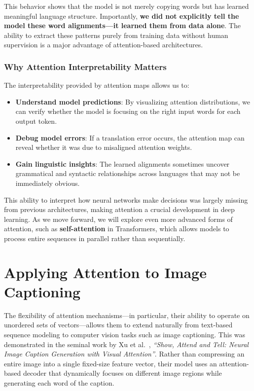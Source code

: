 This behavior shows that the model is not merely copying words but has learned meaningful language structure. Importantly, \textbf{we did not explicitly tell the model these word alignments—it learned them from data alone}. The ability to extract these patterns purely from training data without human supervision is a major advantage of attention-based architectures.

\subsubsection{Why Attention Interpretability Matters}

The interpretability provided by attention maps allows us to:
\begin{itemize}
    \item \textbf{Understand model predictions}: By visualizing attention distributions, we can verify whether the model is focusing on the right input words for each output token.
    \item \textbf{Debug model errors}: If a translation error occurs, the attention map can reveal whether it was due to misaligned attention weights.
    \item \textbf{Gain linguistic insights}: The learned alignments sometimes uncover grammatical and syntactic relationships across languages that may not be immediately obvious.
\end{itemize}

This ability to interpret how neural networks make decisions was largely missing from previous architectures, making attention a crucial development in deep learning. As we move forward, we will explore even more advanced forms of attention, such as \textbf{self-attention} in Transformers, which allows models to process entire sequences in parallel rather than sequentially.

\newpage

\section{Applying Attention to Image Captioning}

The flexibility of attention mechanisms---in particular, their ability to operate on unordered sets of vectors---allows them to extend naturally from text-based sequence modeling to computer vision tasks such as image captioning.
This was demonstrated in the seminal work by Xu et al.~\cite{xu2015_showattend}, \emph{``Show, Attend and Tell: Neural Image Caption Generation with Visual Attention''}.
Rather than compressing an entire image into a single fixed-size feature vector, their model uses an attention-based decoder that dynamically focuses on different image regions while generating each word of the caption.

